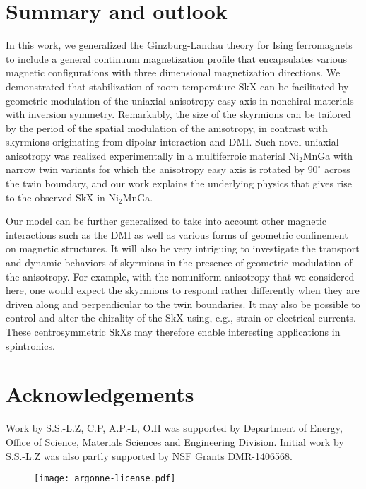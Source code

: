 \documentclass[10pt,onecolumn,prb,aps,notitlepage]{revtex4}
\begin{document}
\section{Summary and outlook}
In this work, we generalized the Ginzburg-Landau theory for Ising ferromagnets to include a general continuum magnetization profile that encapsulates various magnetic configurations with three dimensional magnetization directions. We demonstrated that stabilization of room temperature SkX can be facilitated by geometric modulation of the uniaxial anisotropy easy axis in nonchiral materials with inversion symmetry. Remarkably, the size of the skyrmions can be tailored by the period of the spatial modulation of the anisotropy, in contrast with skyrmions originating from dipolar interaction and DMI. Such novel uniaxial anisotropy was realized experimentally in a multiferroic material Ni$_2$MnGa with narrow twin variants for which the anisotropy easy axis is rotated by $90^{\circ}$ across the twin boundary, and our work explains the underlying physics that gives rise to the observed SkX in Ni$_2$MnGa.

Our model can be further generalized to take into account other magnetic interactions such as the DMI as well as various forms of geometric confinement on magnetic structures. It will also be very intriguing to investigate the transport and dynamic behaviors of skyrmions in the presence of geometric modulation of the anisotropy. For example, with the nonuniform anisotropy that we considered here, one would expect the skyrmions to respond rather differently when they are driven along and perpendicular to the twin boundaries. It may also be possible to control and alter the chirality of the SkX using, e.g., strain or electrical currents. These centrosymmetric SkXs may therefore enable interesting applications in spintronics.

\section*{Acknowledgements}
Work by S.S.-L.Z, C.P, A.P.-L, O.H was supported by Department of Energy, Office of Science, Materials Sciences and Engineering Division. Initial work by S.S.-L.Z was also partly supported by NSF Grants DMR-1406568.
\begin{figure}[h!]
\centering
\texttt{[image: argonne-license.pdf]}
\end{figure}

\appendix
\end{document}

